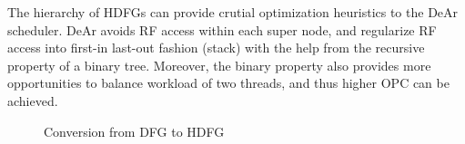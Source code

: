\indent The hierarchy of HDFGs can provide crutial optimization heuristics to the DeAr scheduler.
DeAr avoids RF access within each super node, and regularize RF access into first-in last-out fashion (stack) with the help from the recursive property of a binary tree.
Moreover, the binary property also provides more opportunities to balance workload of two threads, and thus higher OPC can be achieved.
\vspace{\textfig}
\begin{figure}[!ht]
    \begin{center}
    \end{center}
    \caption{Conversion from DFG to HDFG}
    \label{fig:dfg}
\end{figure}



